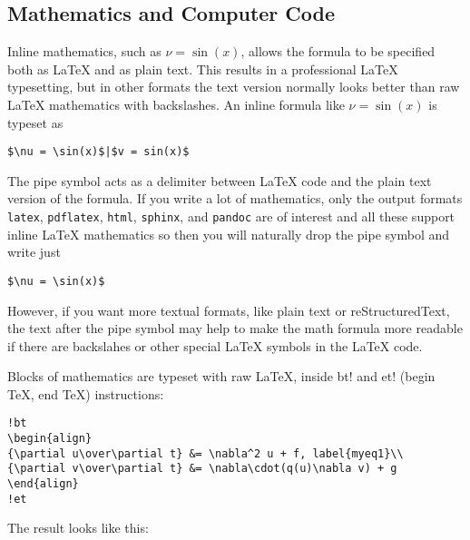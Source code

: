 \documentclass[%
oneside,                 %
final,                   %
10pt]{article}
\begin{document}
\noindent

\subsection{Mathematics and Computer Code}

Inline mathematics, such as $\nu = \sin(x)$,
allows the formula to be specified both as {\LaTeX} and as plain text.
This results in a professional {\LaTeX} typesetting, but in other formats
the text version normally looks better than raw {\LaTeX} mathematics with
backslashes. An inline formula like $\nu = \sin(x)$ is
typeset as

\begin{Verbatim}[fontsize=\fontsize{9pt}{9pt},tabsize=8,baselinestretch=0.85,
fontfamily=tt,xleftmargin=7mm]
$\nu = \sin(x)$|$v = sin(x)$
\end{Verbatim}
\noindent
The pipe symbol acts as a delimiter between {\LaTeX} code and the plain text
version of the formula. If you write a lot of mathematics, only the
output formats {\fontsize{10pt}{10pt}\Verb!latex!}, {\fontsize{10pt}{10pt}\Verb!pdflatex!}, {\fontsize{10pt}{10pt}\Verb!html!}, {\fontsize{10pt}{10pt}\Verb!sphinx!}, and {\fontsize{10pt}{10pt}\Verb!pandoc!}
are of interest
and all these support inline {\LaTeX} mathematics so then you will naturally
drop the pipe symbol and write just

\begin{Verbatim}[fontsize=\fontsize{9pt}{9pt},tabsize=8,baselinestretch=0.85,
fontfamily=tt,xleftmargin=7mm]
$\nu = \sin(x)$
\end{Verbatim}
\noindent
However, if you want more textual formats, like plain text or reStructuredText,
the text after the pipe symbol may help to make the math formula more readable
if there are backslahes or other special {\LaTeX} symbols in the {\LaTeX} code.

Blocks of mathematics are typeset with raw {\LaTeX}, inside
{\fontsize{10pt}{10pt}\Verb!!bt!} and {\fontsize{10pt}{10pt}\Verb!!et!} (begin TeX, end TeX) instructions:

\begin{Verbatim}[fontsize=\fontsize{9pt}{9pt},tabsize=8,baselinestretch=0.85,
fontfamily=tt,xleftmargin=7mm]
!bt
\begin{align}
{\partial u\over\partial t} &= \nabla^2 u + f, label{myeq1}\\
{\partial v\over\partial t} &= \nabla\cdot(q(u)\nabla v) + g
\end{align}
!et
\end{Verbatim}
\noindent
The result looks like this:
\end{document}
